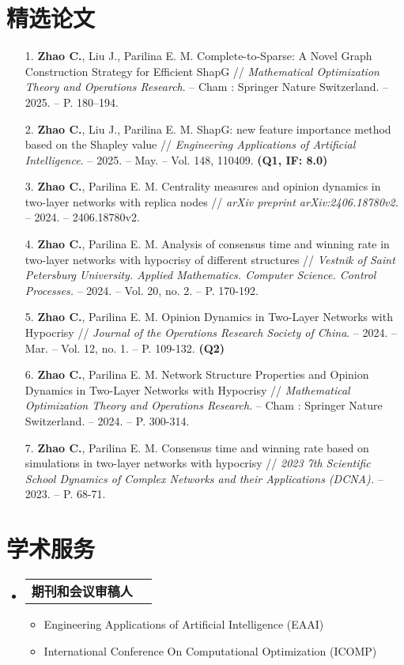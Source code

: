 \documentclass[UTF8,10pt]{ctexart}
\makeatletter
\newcommand{\resumeItem}[1]{
  \item\small{
    {#1 \vspace{-2pt}}
  }
}
\newcommand{\resumeProjectHeading}[2]{
  \item
  \begin{tabular*}{0.97\textwidth}{l@{\extracolsep{\fill}}r}
    \small#1 & #2 \\
  \end{tabular*}\vspace{-7pt}
}
\newenvironment{resumeSubHeadingList}{\begin{itemize}[leftmargin=0.15in, label={}]}{\end{itemize}}
\newenvironment{resumeItemList}{\begin{itemize}}{\end{itemize}}
\makeatother
\begin{document}
\section{精选论文}
\begin{enumerate}
  \fontsize{10}{10.5}\selectfont
  \item [1.] \textbf{Zhao C.}, Liu J., Parilina E. M. Complete-to-Sparse: A Novel Graph Construction Strategy for Efficient ShapG // {\it Mathematical Optimization Theory and Operations Research}. -- Cham : Springer Nature Switzerland. -- 2025. -- P. 180–194.
  \item [2.] \textbf{Zhao C.}, Liu J., Parilina E. M. ShapG: new feature importance method based on the Shapley value // {\it Engineering Applications of Artificial Intelligence.} -- 2025. -- May. -- Vol. 148, 110409. {\bf (Q1, IF: 8.0)}
  \item [3.] \textbf{Zhao C.}, Parilina E. M. Centrality measures and opinion dynamics in two-layer networks with replica nodes // {\it arXiv preprint arXiv:2406.18780v2.} -- 2024. -- 2406.18780v2.
  \item [4.] \textbf{Zhao C.}, Parilina E. M. Analysis of consensus time and winning rate in two-layer networks with hypocrisy of different structures // {\it Vestnik of Saint Petersburg University. Applied Mathematics. Computer Science. Control Processes.} -- 2024. -- Vol. 20, no. 2. -- P. 170-192.
  \item [5.] \textbf{Zhao C.}, Parilina E. M. Opinion Dynamics in Two-Layer Networks with Hypocrisy // {\it Journal of the Operations Research Society of China}. -- 2024. -- Mar. -- Vol. 12, no. 1. -- P. 109-132. {\bf (Q2)}
  \item [6.] \textbf{Zhao C.}, Parilina E. M. Network Structure Properties and Opinion Dynamics in Two-Layer Networks with Hypocrisy // {\it Mathematical Optimization Theory and Operations Research}. -- Cham : Springer Nature Switzerland. -- 2024. -- P. 300-314.
  \item [7.] \textbf{Zhao C.}, Parilina E. M. Consensus time and winning rate based on simulations in two-layer networks with hypocrisy // {\it 2023 7th Scientific School Dynamics of Complex Networks and their Applications (DCNA).} -- 2023. -- P. 68-71.
\end{enumerate}

\section{学术服务}
\begin{resumeSubHeadingList}
  \resumeProjectHeading{{\bf 期刊和会议审稿人}}{}
  \begin{resumeItemList}
    \resumeItem{Engineering Applications of Artificial Intelligence (EAAI)}
    \resumeItem{International Conference On Computational Optimization (ICOMP)}
  \end{resumeItemList}
\end{resumeSubHeadingList}
\end{document}
